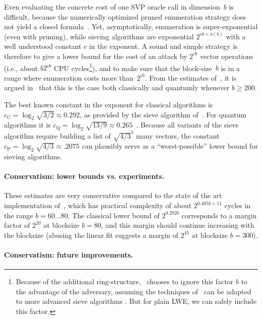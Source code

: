 \documentclass{iacrcc}
\begin{document}
Even evaluating the concrete cost of one SVP oracle call in
dimension~$b$ is difficult, because the numerically optimized pruned
enumeration strategy does not yield a closed
formula~\cite{EC:GamNguReg10,AC:CheNgu11}. Yet, asymptotically,
enumeration is super-exponential (even with pruning), while sieving
algorithms are exponential $2^{cb + o(b)}$ with a well understood
constant $c$ in the exponent. A sound and simple strategy is therefore
to give a lower bound for the cost of an attack by $2^{cb}$ vector
operations (i.e., about $b 2^{cb}$ CPU cycles\footnote{Because of the
  additional ring-structure,~\cite{USENIX:ADPS16} chooses to ignore
  this factor $b$ to the advantage of the adversary, assuming the
  techniques of~\cite{AFRICACRYPT:Schneider13,BNP_IJAC16} can be
  adapted to more advanced sieve algorithms \cite{USENIX:ADPS16}. But
  for plain LWE, we can safely include this factor.}), and to make
sure that the block-size~$b$ is in a range where enumeration costs
more than~$2^{cb}$. From the estimates of~\cite{AC:CheNgu11}, it is
argued in~\cite{USENIX:ADPS16} that this is the case both classically
and quantumly whenever $b \geq 200$.

The best known constant in the exponent for classical algorithms is
$c_{\text{C}} = \log_2 \sqrt{3/2} \approx 0.292$, as provided by the
sieve algorithm of~\cite{SODA:BDGL16}.  For quantum algorithms it is
$c_{\text{Q}} = \log_2 \sqrt{13/9} \approx
0.265$~\cite[Sec. 14.2.10]{LaarhovenThesis}. Because all variants of
the sieve algorithm require building a list of $\sqrt{4/3}^b$ many
vectors, the constant
$c_{\text{P}} = \log_2 \sqrt{4/3} \approx {.2075}$ can plausibly serve
as a ``worst-possible'' lower bound for sieving algorithms.

\paragraph{Conservatism: lower bounds vs. experiments.}

These estimates are very conservative compared to the state of the art
implementation of~\cite{mariano2017parallel}, which has practical
complexity of about $2^{0.405 b + 11}$ cycles in the range
$b=60 \dots 80$. The classical lower bound of $2^{0.292b}$ corresponds
to a margin factor of $2^{20}$ at blocksize $b=80$, and this margin
should continue increasing with the blocksize (abusing the linear fit
suggests a margin of $2^{45}$ at blocksize $b=300$).

\paragraph{Conservatism: future improvements.}
\end{document}

